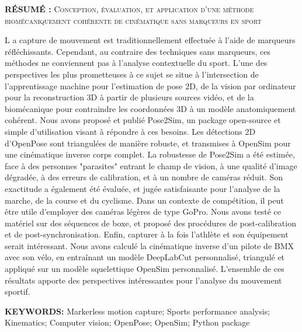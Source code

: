 \vspace*{1cm}

\noindent\textbf{RÉSUMÉ : } \textsc{Conception, évaluation, et application d’une méthode biomécaniquement cohérente de cinématique sans marqueurs en sport}

\lettrine[lines=1]{L}{ }a capture de mouvement est traditionnellement effectuée à l'aide de marqueurs réfléchissants. Cependant, au contraire des techniques sans marqueurs, ces méthodes ne conviennent pas à l'analyse contextuelle du sport. L'une des perspectives les plus prometteuses à ce sujet se situe à l'intersection de l'apprentissage machine pour l'estimation de pose 2D, de la vision par ordinateur pour la reconstruction 3D à partir de plusieurs sources vidéo, et de la biomécanique pour contraindre les coordonnées 3D à un modèle anatomiquement cohérent. Nous avons proposé et publié Pose2Sim, un package open-source et simple d'utilisation visant à répondre à ces besoins. Les détections 2D d'OpenPose sont triangulées de manière robuste, et transmises à OpenSim pour une cinématique inverse corps complet. La robustesse de Pose2Sim a été estimée, face à des personnes "parasites" entrant le champ de vision, à une qualité d'image dégradée, à des erreurs de calibration, et à un nombre de caméras réduit. Son exactitude a également été évaluée, et jugée satisfaisante pour l'analyse de la marche, de la course et du cyclisme. Dans un contexte de compétition, il peut être utile d'employer des caméras légères de type GoPro. Nous avons testé ce matériel sur des séquences de boxe, et proposé des procédures de post-calibration et de post-synchronisation. Enfin, capturer à la fois l'athlète et son équipement serait intéressant. Nous avons calculé la cinématique inverse d'un pilote de BMX avec son vélo, en entraînant un modèle DeepLabCut personnalisé, triangulé et appliqué sur un modèle squelettique OpenSim personnalisé. L'ensemble de ces résultats apporte des perspectives intéressantes pour l'analyse du mouvement sportif.

\vspace*{1cm}
\noindent\textbf{KEYWORDS:} Markerless motion capture; Sports performance analysis; Kinematics; Computer vision; OpenPose; OpenSim; Python package






